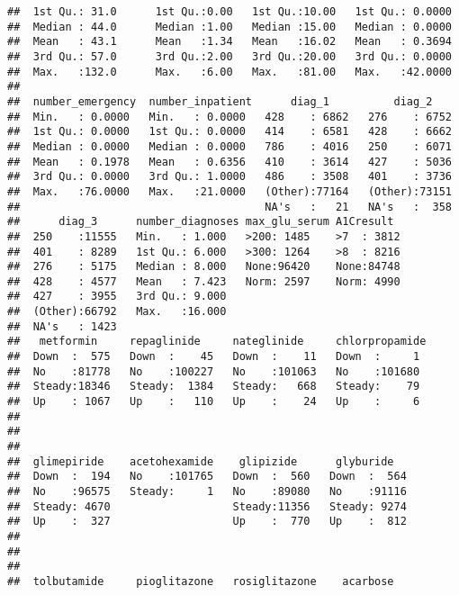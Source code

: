 \documentclass[]{article}
\begin{document}
\begin{verbatim}
##  1st Qu.: 31.0      1st Qu.:0.00   1st Qu.:10.00   1st Qu.: 0.0000  
##  Median : 44.0      Median :1.00   Median :15.00   Median : 0.0000  
##  Mean   : 43.1      Mean   :1.34   Mean   :16.02   Mean   : 0.3694  
##  3rd Qu.: 57.0      3rd Qu.:2.00   3rd Qu.:20.00   3rd Qu.: 0.0000  
##  Max.   :132.0      Max.   :6.00   Max.   :81.00   Max.   :42.0000  
##                                                                     
##  number_emergency  number_inpatient      diag_1          diag_2     
##  Min.   : 0.0000   Min.   : 0.0000   428    : 6862   276    : 6752  
##  1st Qu.: 0.0000   1st Qu.: 0.0000   414    : 6581   428    : 6662  
##  Median : 0.0000   Median : 0.0000   786    : 4016   250    : 6071  
##  Mean   : 0.1978   Mean   : 0.6356   410    : 3614   427    : 5036  
##  3rd Qu.: 0.0000   3rd Qu.: 1.0000   486    : 3508   401    : 3736  
##  Max.   :76.0000   Max.   :21.0000   (Other):77164   (Other):73151  
##                                      NA's   :   21   NA's   :  358  
##      diag_3      number_diagnoses max_glu_serum A1Cresult   
##  250    :11555   Min.   : 1.000   >200: 1485    >7  : 3812  
##  401    : 8289   1st Qu.: 6.000   >300: 1264    >8  : 8216  
##  276    : 5175   Median : 8.000   None:96420    None:84748  
##  428    : 4577   Mean   : 7.423   Norm: 2597    Norm: 4990  
##  427    : 3955   3rd Qu.: 9.000                             
##  (Other):66792   Max.   :16.000                             
##  NA's   : 1423                                              
##   metformin     repaglinide     nateglinide     chlorpropamide 
##  Down  :  575   Down  :    45   Down  :    11   Down  :     1  
##  No    :81778   No    :100227   No    :101063   No    :101680  
##  Steady:18346   Steady:  1384   Steady:   668   Steady:    79  
##  Up    : 1067   Up    :   110   Up    :    24   Up    :     6  
##                                                                
##                                                                
##                                                                
##  glimepiride    acetohexamide    glipizide      glyburide    
##  Down  :  194   No    :101765   Down  :  560   Down  :  564  
##  No    :96575   Steady:     1   No    :89080   No    :91116  
##  Steady: 4670                   Steady:11356   Steady: 9274  
##  Up    :  327                   Up    :  770   Up    :  812  
##                                                              
##                                                              
##                                                              
##  tolbutamide     pioglitazone   rosiglitazone    acarbose     

\end{verbatim}
\end{document}
